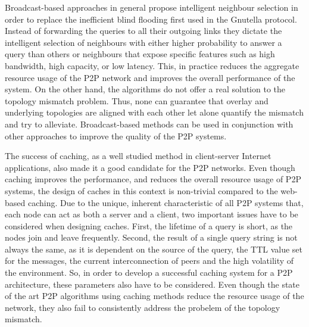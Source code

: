 \documentclass[acmcsur,acmnow]{acmtrans2m}
\begin{document}
Broadcast-based approaches in general propose intelligent neighbour
selection in order to replace the inefficient blind flooding first used in the Gnutella protocol. Instead of forwarding the queries to all their outgoing links they dictate the intelligent selection of neighbours with either higher probability to answer a query than others or neighbours  that expose specific features such as high bandwidth, high capacity, or low latency. This, in practice reduces the aggregate resource usage of the P2P network and improves the overall performance of the system. On the other hand, the algorithms do not offer a real solution to the topology mismatch problem. Thus, none can guarantee that overlay and underlying topologies are aligned with each other let alone quantify the mismatch and try to alleviate. Broadcast-based methods can be used in conjunction with other approaches to improve the quality of the P2P systems.

The success of caching, as a well studied method in client-server Internet
applications, also made it a good candidate for the P2P networks. Even
though caching improves the performance, and reduces the overall resource usage
of P2P systems, the design of caches in this context is non-trivial compared to the web-based caching. Due to the unique, inherent characteristic of all P2P systems that, each node can act as both a server and a client, two important issues have to be considered when designing caches. First, the lifetime of a query is short, as the nodes join and
leave frequently. Second, the result of a single query string is not always the
same, as it is dependent on the source of the query, the TTL value set for the messages, the current interconnection of peers and the high volatility of the environment. So, in order to develop a successful caching system for a P2P architecture, these parameters also have to be considered. Even though the state of the art P2P algorithms using caching methods reduce the resource usage of the network, they also fail to consistently address the probelem of the topology mismatch.
\end{document}
